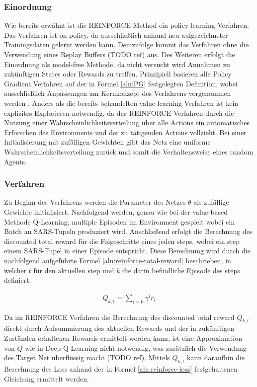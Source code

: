 \documentclass[11pt]{scrartcl}
\begin{document}
\subsubsection{Einordnung}
Wie bereits erwähnt ist die REINFORCE Method ein policy learning Verfahren. Das Verfahren ist
on-policy, da ausschließlich anhand neu aufgezeichneter Trainingsdaten gelernt werden kann.
Demzufolge kommt das Verfahren ohne die Verwendung eines Replay Buffers (TODO ref) %
aus. Des Weiteren erfolgt die Einordnung als model-free Methode, da nicht versucht wird
Annahmen zu zukünftigen States oder Rewards zu treffen. Prinzipiell basieren alle Policy
Gradient Verfahren auf der in Formel \ref{aln:PG} festgelegten Definition, wobei
ausschließlich Anpassungen am Kernkonzept des Verfahrens vorgenommen werden
\cite[~S.244 f.]{L2018}. Anders als die bereits behandelten value-learning Verfahren ist
kein explizites Explorieren notwendig, da das REINFORCE Verfahren durch die Nutzung einer
Wahrscheinlichkeitsverteilung über alle Actions ein automatisches \grqq Erforschen\grqq 
des Environments und der zu tätigenden Actions vollzieht. Bei einer Initialisierung mit
zufälligen Gewichten gibt das Netz eine uniforme Wahrscheinlichkeitsverteilung zurück und
somit die Verhaltensweise eines random Agents.


\subsubsection{Verfahren}
Zu Beginn des Verfahrens werden die Parameter des Netzes $\theta$ als zufällige Gewichte
initialisiert. Nachfolgend werden, genau wie bei der value-based Methode Q-Learning,
multiple Episoden im Environment gespielt wobei ein Batch an SARS-Tupeln produziert wird.
Anschließend erfolgt die Berechnung des discounted total reward für die Folgeschritte eines
jeden steps, wobei ein step einem SARS-Tupel in einer Episode entspricht. Diese Berechnung
wird durch die nachfolgend aufgeführte Formel \ref{aln:reinforce-total-reward} beschrieben,
in welcher $t$ für den aktuellen step und $k$ die darin befindliche Episode des steps
definiert. 

\begin{align}
Q_{k,t}=\sum_{i=0} \gamma^{i}r_{i}
\label{aln:reinforce-total-reward}
\end{align}

Da im REINFORCE Verfahren die Berechnung des discounted total reward $Q_{k,t}$ direkt durch
Aufsummierung des aktuellen Rewards und der in zukünftigen Zuständen erhaltenen Rewards
ermittelt werden kann, ist eine Approximation von $Q$ wie in Deep-Q-Learning nicht notwendig,
was zusätzlich die Verwendung des Target Net überflüssig macht (TODO ref). %
Mittels $Q_{k,t}$ kann daraufhin die Berechnung des Loss anhand der in Formel
\ref{aln:reinforce-loss} festgehaltenen Gleichung ermittelt werden.
\end{document}

